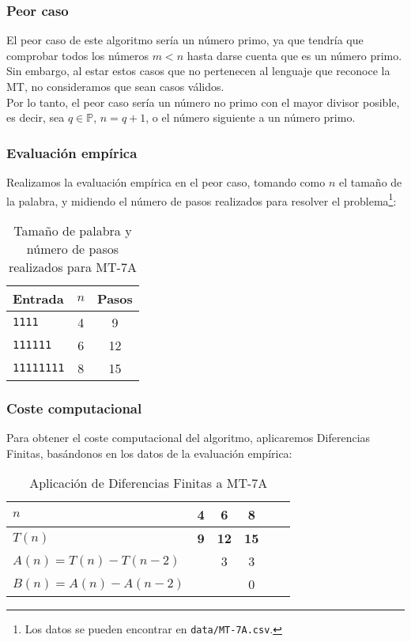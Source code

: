 

\subsubsection*{Peor caso}
El peor caso de este algoritmo sería un número primo, ya que tendría que comprobar todos los números $m < n$ hasta darse cuenta que es un número primo. Sin embargo, al estar estos casos que no pertenecen al lenguaje que reconoce la MT, no consideramos que sean casos válidos.\\
Por lo tanto, el peor caso sería un número no primo con el mayor divisor posible, es decir, sea $q \in \mathbb{P}$, $n = q + 1$, o el número siguiente a un número primo.


\subsubsection*{Evaluación empírica}
Realizamos la evaluación empírica en el peor caso, tomando como $n$ el tamaño de la palabra, y midiendo el número de pasos realizados para resolver el problema\footnote{Los datos se pueden encontrar en \texttt{data/MT-7A.csv}.}:

\begin{table}[h]
    \centering
    \begin{tabular}{lcc}
        Entrada & $n$ & Pasos \\
        \hline
        \texttt{1111}              &  4  & 9  \\
        \texttt{111111}            &  6  & 12 \\
        \texttt{11111111}          &  8  & 15 \\
    \end{tabular}
    \caption{Tamaño de palabra y número de pasos realizados para MT-7A}
\end{table}


\subsubsection*{Coste computacional}
Para obtener el coste computacional del algoritmo, aplicaremos Diferencias Finitas, basándonos en los datos de la evaluación empírica:

\begin{table}[H]
    \centering
    \begin{tabular}{|l|c|c|c|c|c|}
        \hline
        $n$    & \textbf{4}  & \textbf{6}  & \textbf{8}  \\ \hline
        $T(n)$ & \textbf{9}  & \textbf{12} & \textbf{15} \\ \hline
        \hline
        $A(n) = T(n) - T(n-2)$ &   & 3 & 3 \\ \hline
        $B(n) = A(n) - A(n-2)$ &   &   & 0 \\ \hline
    \end{tabular}
    \caption{Aplicación de Diferencias Finitas a MT-7A}
\end{table}

